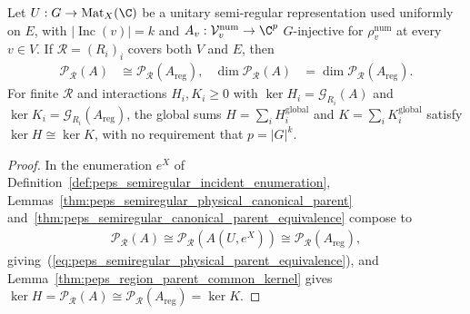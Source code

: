 \begin{lemma}%
    \label{thm:peps_semiregular_g_injective_parent_kernel}
    \leanok
    Let $U:G\to\operatorname{Mat}_X(\C)$ be a unitary semi-regular
    representation used uniformly on $E$, with $|\operatorname{Inc}(v)|=k$ and
    $A_v:\mathcal V_v^{\mathrm{num}}\to\C^p$ $G$-injective for
    $\rho_v^{\mathrm{num}}$ at every $v\in V$. If $\mathcal R=(R_i)_i$ covers
    both $V$ and $E$, then
    \begin{align}
        \mathcal P_{\mathcal R}(A) & \cong
        \mathcal P_{\mathcal R}(A_{\mathrm{reg}}),
                                   & \dim\mathcal P_{\mathcal R}(A) & =
        \dim\mathcal P_{\mathcal R}(A_{\mathrm{reg}}).
        \label{eq:peps_semiregular_physical_parent_equivalence}
    \end{align}
    For finite $\mathcal R$ and interactions $H_i,K_i\ge0$ with
    $\ker H_i=\mathcal G_{R_i}(A)$ and $\ker K_i=\mathcal G_{R_i}(A_{\mathrm{reg}})$,
    the global sums $H=\sum_i H_i^{\mathrm{global}}$ and
    $K=\sum_i K_i^{\mathrm{global}}$ satisfy $\ker H\cong\ker K$, with no
    requirement that $p=|G|^k$.
\end{lemma}
\begin{proof}\leanok
    In the enumeration $e^X$ of Definition~\ref{def:peps_semiregular_incident_enumeration},
    Lemmas~\ref{thm:peps_semiregular_physical_canonical_parent}
    and~\ref{thm:peps_semiregular_canonical_parent_equivalence} compose to
    \begin{align}
        \mathcal P_{\mathcal R}(A)
        \cong\mathcal P_{\mathcal R}(A(U,e^X))
        \cong\mathcal P_{\mathcal R}(A_{\mathrm{reg}}),
    \end{align}
    giving~(\ref{eq:peps_semiregular_physical_parent_equivalence}), and
    Lemma~\ref{thm:peps_region_parent_common_kernel} gives
    $\ker H=\mathcal P_{\mathcal R}(A)\cong\mathcal P_{\mathcal R}(A_{\mathrm{reg}})=\ker K$.
\end{proof}

